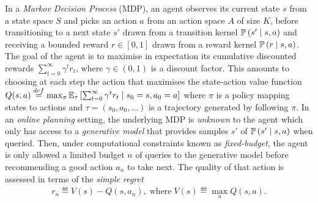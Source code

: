 \documentclass[runningheads]{llncs}
\begin{document}
In a \emph{Markov Decision Process} (MDP), an agent observes its current state $s$ from a state space $S$ and picks an action $a$ from an action space $A$ of size $K$, before transitioning to a next state $s'$ drawn from a transition kernel $\mathbb{P}\left(s'\;\middle|\; s,a\right)$ and receiving a bounded reward $r\in[0, 1]$ drawn from a reward kernel $\mathbb{P}\left(r \;\middle|\; s, a\right)$.
The goal of the agent is to maximise in expectation its cumulative discounted rewards $\sum_{t=0}^\infty \gamma^t r_t$, where $\gamma\in(0, 1)$ is a discount factor. This amounts to choosing at each step the action that maximises the state-action value function %
$
Q(s, a) \stackrel{def}{=} \max_\pi  \operatorname*{\mathbb{E}}_\tau \left[\sum_{t=0}^\infty \gamma^t r_t\;\middle|\; s_0 = s, a_0 = a\right]
$
where $\pi$ is a policy mapping states to actions and $\tau = (s_0, a_0, \dots)$ is a trajectory generated by following $\pi$. In an \emph{online planning} setting, the underlying MDP is \emph{unknown} to the agent which only has access to a \emph{generative model} that provides samples $s'$ of $\mathbb{P}\left(s' \;\middle|\; s, a\right)$ when queried. Then, under computational constraints known as \emph{fixed-budget}, the agent is only allowed a limited budget $n$ of queries to the generative model before recommending a good action $a_n$ to take next.
The quality of that action is assessed in terms of the \emph{simple regret}
\begin{align}
	r_n \eqdef V(s) - Q(s, {a}_n), \; \mbox{where} \; V(s) \eqdef  \max_a Q(s, a).
\end{align}
\end{document}
